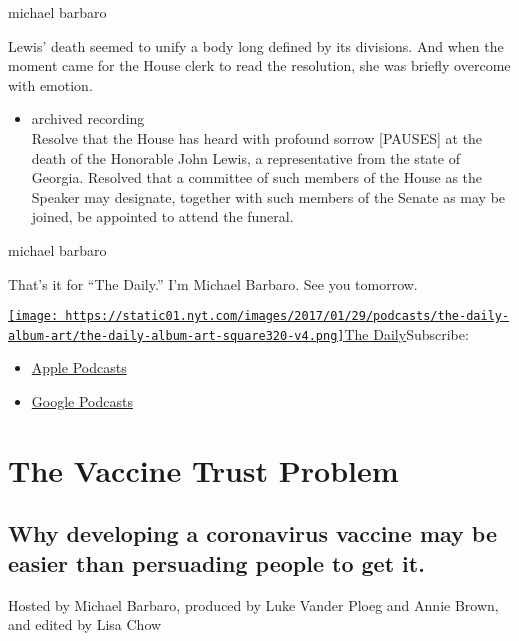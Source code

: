 michael barbaro

Lewis' death seemed to unify a body long defined by its divisions. And
when the moment came for the House clerk to read the resolution, she was
briefly overcome with emotion.

\begin{itemize}
\tightlist
\item
  archived recording\\
  Resolve that the House has heard with profound sorrow {[}PAUSES{]} at
  the death of the Honorable John Lewis, a representative from the state
  of Georgia. Resolved that a committee of such members of the House as
  the Speaker may designate, together with such members of the Senate as
  may be joined, be appointed to attend the funeral.
\end{itemize}

michael barbaro

That's it for ``The Daily.'' I'm Michael Barbaro. See you tomorrow.

\href{https://www.nytimes.com/column/the-daily}{\texttt{[image: https://static01.nyt.com/images/2017/01/29/podcasts/the-daily-album-art/the-daily-album-art-square320-v4.png]}The
Daily}Subscribe:

\begin{itemize}
\tightlist
\item
  \href{https://itunes.apple.com/us/podcast/id1200361736}{Apple
  Podcasts}
\item
  \href{https://www.google.com/podcasts?feed=aHR0cHM6Ly9yc3MuYXJ0MTkuY29tL3RoZS1kYWlseQ\%3D\%3D}{Google
  Podcasts}
\end{itemize}

\hypertarget{the-vaccine-trust-problem-1}{%
\section{The Vaccine Trust Problem}\label{the-vaccine-trust-problem-1}}

\hypertarget{why-developing-a-coronavirus-vaccine-may-be-easier-than-persuading-people-to-get-it-1}{%
\subsection{Why developing a coronavirus vaccine may be easier than
persuading people to get
it.}\label{why-developing-a-coronavirus-vaccine-may-be-easier-than-persuading-people-to-get-it-1}}

Hosted by Michael Barbaro, produced by Luke Vander Ploeg and Annie
Brown, and edited by Lisa Chow

